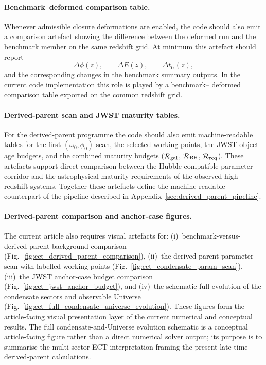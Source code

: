 \documentclass[11pt,a4paper]{article}
\numberwithin{equation}{section}
\begin{document}
\paragraph{Benchmark--deformed comparison table.}
Whenever admissible closure deformations are enabled, the code should
also emit a comparison artefact showing the difference between the
deformed run and the benchmark member on the same redshift grid.
At minimum this artefact should report
\[
\Delta\phi(z),\qquad
\Delta E(z),\qquad
\Delta t_U(z),
\]
and the corresponding changes in the benchmark summary outputs.
In the current code implementation this role is played by a benchmark--
deformed comparison table exported on the common redshift grid.

\paragraph{Derived-parent scan and JWST maturity tables.}
For the derived-parent programme the code should also emit machine-readable
tables for the first $(\omega_0,\phi_0)$ scan, the selected working points,
the JWST object age budgets, and the combined maturity budgets
($\mathcal R_{\rm gal}$, $\mathcal R_{\rm BH}$, $\mathcal R_{\rm req}$).
These artefacts support direct comparison between the Hubble-compatible
parameter corridor and the astrophysical maturity requirements of the
observed high-redshift systems.
Together these artefacts define the machine-readable counterpart of the
pipeline described in Appendix~\ref{sec:derived_parent_pipeline}.

\paragraph{Derived-parent comparison and anchor-case figures.}
The current article also requires visual artefacts for:
(i)~benchmark-versus-derived-parent background comparison
(Fig.~\ref{fig:ect_derived_parent_comparison}),
(ii)~the derived-parent parameter scan with labelled working points
(Fig.~\ref{fig:ect_condensate_param_scan}),
(iii)~the JWST anchor-case budget comparison
(Fig.~\ref{fig:ect_jwst_anchor_budget}),
and (iv)~the schematic full evolution of the condensate sectors and
observable Universe
(Fig.~\ref{fig:ect_full_condensate_universe_evolution}).
These figures form the article-facing visual presentation layer of the
current numerical and conceptual results.
The full condensate-and-Universe evolution schematic is a conceptual
article-facing figure rather than a direct numerical solver output;
its purpose is to summarise the multi-sector ECT interpretation
framing the present late-time derived-parent calculations.
\end{document}
